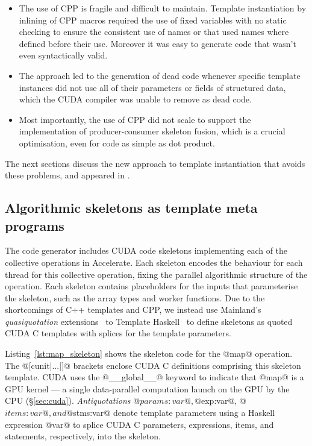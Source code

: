 \begin{itemize}
    \item The use of CPP is fragile and difficult to maintain. Template
        instantiation by inlining of CPP macros required the use of fixed
        variables with no static checking to ensure the consistent use of names
        or that used names where defined before their use. Moreover it was easy
        to generate code that wasn't even syntactically valid.

    \item The approach led to the generation of dead code whenever specific
        template instances did not use all of their parameters or fields of
        structured data, which the CUDA compiler was unable to remove as dead
        code.

    \item Most importantly, the use of CPP did not scale to support the
        implementation of producer-consumer skeleton fusion, which is a crucial
        optimisation, even for code as simple as dot product.

\end{itemize}

The next sections discuss the new approach to template instantiation that avoids
these problems, and appeared in \cite{CliftonEverest:2014vi}.


\subsection{Algorithmic skeletons as template meta programs}

The code generator includes CUDA code skeletons implementing each of the
collective operations in Accelerate. Each skeleton encodes the behaviour for
each thread for this collective operation, fixing the parallel algorithmic
structure of the operation. Each skeleton contains placeholders for the inputs
that parameterise the skeleton, such as the array types and worker functions.
Due to the shortcomings of C++ templates and CPP, we instead use Mainland's
\emph{quasiquotation} extensions~\cite{Mainland:2007bl} to Template
Haskell~\cite{Sheard:2002wu} to define skeletons as quoted CUDA C templates
with splices for the template parameters.

Listing~\ref{lst:map_skeleton} shows the skeleton code for the @map@
operation. The @[cunit|...|]@ brackets enclose CUDA C definitions
comprising this skeleton template. CUDA uses the @__global__@ keyword to
indicate that @map@ is a GPU kernel --- a single data-parallel computation
launch on the GPU by the CPU (\S\ref{sec:cuda}).
\emph{Antiquotations} @$params:var@, @$exp:var@,
@$items:var@, and @$stms:var@ denote template parameters using a
Haskell expression @var@ to splice CUDA C parameters, expressions, items,
and statements, respectively, into the skeleton.

